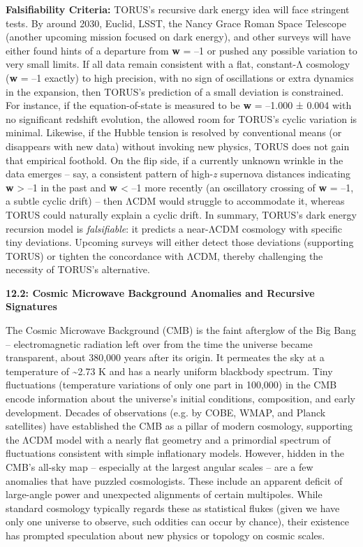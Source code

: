 \documentclass[]{article}
\begin{document}
\textbf{Falsifiability Criteria:} TORUS's recursive dark energy idea
will face stringent tests. By around 2030, Euclid, LSST, the Nancy Grace
Roman Space Telescope (another upcoming mission focused on dark energy),
and other surveys will have either found hints of a departure from
\textbf{w} = --1 or pushed any possible variation to very small limits.
If all data remain consistent with a flat, constant-Λ cosmology
(\textbf{w} = --1 exactly) to high precision, with no sign of
oscillations or extra dynamics in the expansion, then TORUS's prediction
of a small deviation is constrained. For instance, if the
equation-of-state is measured to be \textbf{w} = --1.000 ± 0.004 with no
significant redshift evolution, the allowed room for TORUS's cyclic
variation is minimal. Likewise, if the Hubble tension is resolved by
conventional means (or disappears with new data) without invoking new
physics, TORUS does not gain that empirical foothold. On the flip side,
if a currently unknown wrinkle in the data emerges -- say, a consistent
pattern of high-\emph{z} supernova distances indicating \textbf{w}
\textgreater{} --1 in the past and \textbf{w} \textless{} --1 more
recently (an oscillatory crossing of \textbf{w} = --1, a subtle cyclic
drift) -- then ΛCDM would struggle to accommodate it, whereas TORUS
could naturally explain a cyclic drift. In summary, TORUS's dark energy
recursion model is \emph{falsifiable}: it predicts a near-ΛCDM cosmology
with specific tiny deviations. Upcoming surveys will either detect those
deviations (supporting TORUS) or tighten the concordance with ΛCDM,
thereby challenging the necessity of TORUS's alternative.

\textbf{12.2: Cosmic Microwave Background Anomalies and Recursive
Signatures}

The Cosmic Microwave Background (CMB) is the faint afterglow of the Big
Bang -- electromagnetic radiation left over from the time the universe
became transparent, about 380,000 years after its origin. It permeates
the sky at a temperature of \textasciitilde{}2.73 K and has a nearly
uniform blackbody spectrum. Tiny fluctuations (temperature variations of
only one part in 100,000) in the CMB encode information about the
universe's initial conditions, composition, and early development.
Decades of observations (e.g. by COBE, WMAP, and Planck satellites) have
established the CMB as a pillar of modern cosmology, supporting the ΛCDM
model with a nearly flat geometry and a primordial spectrum of
fluctuations consistent with simple inflationary models. However, hidden
in the CMB's all-sky map -- especially at the largest angular scales --
are a few anomalies that have puzzled cosmologists. These include an
apparent deficit of large-angle power and unexpected alignments of
certain multipoles. While standard cosmology typically regards these as
statistical flukes (given we have only one universe to observe, such
oddities can occur by chance), their existence has prompted speculation
about new physics or topology on cosmic scales.
\end{document}
